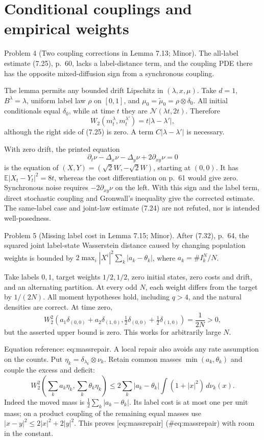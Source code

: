\documentclass[10pt]{article}
\begin{document}
\section*{Conditional couplings and empirical weights}
Problem 4 (Two coupling corrections in Lemma 7.13; Minor).  The all-label estimate (7.25), p. 60, lacks a label-distance term, and the coupling PDE there has the opposite mixed-diffusion sign from a synchronous coupling.\par
The lemma permits any bounded drift Lipschitz in \((\lambda,x,\mu)\). Take \(d=1\), \(B^\lambda=\lambda\), uniform label law \(\rho\) on \([0,1]\), and \(\mu_0=\widetilde\mu_0=\rho\otimes\delta_0\). All initial conditionals equal \(\delta_0\), while at time \(t\) they are \(\mathcal N(\lambda t,2t)\). Therefore \[W_2(m_t^\lambda,m_t^{\lambda'})=t|\lambda-\lambda'|,\] although the right side of (7.25) is zero. A term \(C|\lambda-\lambda'|\) is necessary.\par
With zero drift, the printed equation \[\partial_t\nu-\Delta_x\nu-\Delta_y\nu+2\partial_{xy}\nu=0\] is the equation of \((X,Y)=(\sqrt2W,-\sqrt2W)\), starting at \((0,0)\). It has \(\mathbb E|X_t-Y_t|^2=8t\), whereas the cost differentiation on p. 61 would give zero. Synchronous noise requires \(-2\partial_{xy}\nu\) on the left. With this sign and the label term, direct stochastic coupling and Gronwall’s inequality give the corrected estimate. The same-label case and joint-law estimate (7.24) are not refuted, nor is intended well-posedness.\par
Problem 5 (Missing label cost in Lemma 7.15; Minor).  After (7.32), p. 64, the squared joint label-state Wasserstein distance caused by changing population weights is bounded by \(2\max_i|X^i|^2\sum_k|a_k-\theta_k|\), where \(a_k=\#I_k^N/N\).\par
Take labels \(0,1\), target weights \(1/2,1/2\), zero initial states, zero costs and drift, and an alternating partition. At every odd \(N\), each weight differs from the target by \(1/(2N)\). All moment hypotheses hold, including \(q>4\), and the natural densities are correct. At time zero, \[W_2^2\left(a_1\delta_{(0,0)}+a_2\delta_{(1,0)},
\tfrac12\delta_{(0,0)}+\tfrac12\delta_{(1,0)}\right)=\frac1{2N}>0,\] but the asserted upper bound is zero. This works for arbitrarily large \(N\).\par
Equation reference: eq:massrepair. A local repair also avoids any rate assumption on the counts. Put \(\eta_k=\delta_{\lambda_k}\otimes\nu_k\). Retain common masses \(\min(a_k,\theta_k)\) and couple the excess and deficit: \[
W_2^2\left(\sum_k a_k\eta_k,\sum_k\theta_k\eta_k\right)
\le2\sum_k|a_k-\theta_k|\int(1+|x|^2)\,d\nu_k(x).\] Indeed the moved mass is \(\tfrac12\sum_k|a_k-\theta_k|\). Its label cost is at most one per unit mass; on a product coupling of the remaining equal masses use \(|x-y|^2\le2|x|^2+2|y|^2\). This proves [eq:massrepair] (\#eq:massrepair) with room in the constant.\par
\end{document}
